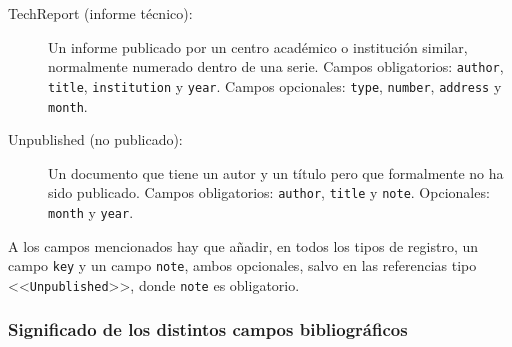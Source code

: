 \documentclass[a4paper,11pt]{article}
\def\ltr#1-{<<\texttt{#1}>>}
\begin{document}
\begin{description}
\item[TechReport  (informe  técnico):]  Un  informe publicado  por  un  centro
  académico o  institución similar, normalmente numerado dentro  de una serie.
  Campos obligatorios: \texttt{author}, \texttt{title}, \texttt{institution} y
  \texttt{year}.     Campos   opcionales:    \texttt{type},   \texttt{number},
  \texttt{address} y \texttt{month}.

\item[Unpublished (no publicado):] Un documento que tiene un autor y un título
  pero   que  formalmente   no  ha   sido  publicado.    Campos  obligatorios:
  \texttt{author}, \texttt{title} y \texttt{note}.  Opcionales: \texttt{month}
  y \texttt{year}.

\end{description}

A los  campos mencionados hay que añadir,  en todos los tipos  de registro, un
campo \texttt{key}  y un campo  \texttt{note}, ambos opcionales, salvo  en las
referencias tipo \ltr Unpublished-, donde \texttt{note} es obligatorio.

\subsubsection{Significado de los distintos campos bibliográficos}
\label{sec:campos-de-datos-1}
\end{document}
